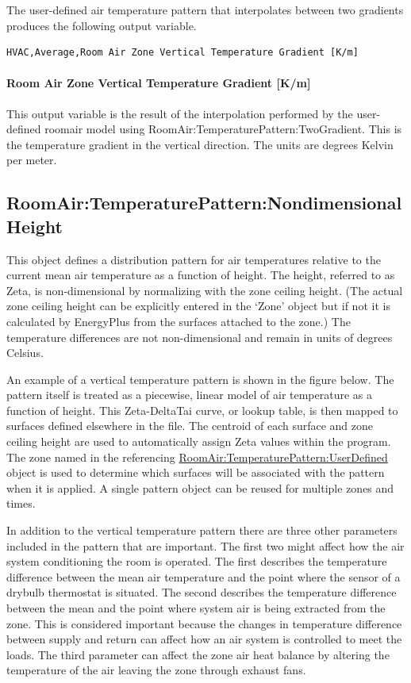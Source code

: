 The user-defined air temperature pattern that interpolates between two gradients produces the following output variable.

\begin{lstlisting}
HVAC,Average,Room Air Zone Vertical Temperature Gradient [K/m]
\end{lstlisting}

\paragraph{Room Air Zone Vertical Temperature Gradient {[}K/m{]}}\label{room-air-zone-vertical-temperature-gradient-km}

This output variable is the result of the interpolation performed by the user-defined roomair model using RoomAir:TemperaturePattern:TwoGradient. This is the temperature gradient in the vertical direction. The units are degrees Kelvin per meter.

\subsection{RoomAir:TemperaturePattern:NondimensionalHeight}\label{roomairtemperaturepatternnondimensionalheight}

This object defines a distribution pattern for air temperatures relative to the current mean air temperature as a function of height. The height, referred to as Zeta, is non-dimensional by normalizing with the zone ceiling height. (The actual zone ceiling height can be explicitly entered in the `Zone' object but if not it is calculated by EnergyPlus from the surfaces attached to the zone.) The temperature differences are not non-dimensional and remain in units of degrees Celsius.

An example of a vertical temperature pattern is shown in the figure below. The pattern itself is treated as a piecewise, linear model of air temperature as a function of height. This Zeta-DeltaTai curve, or lookup table, is then mapped to surfaces defined elsewhere in the file. The centroid of each surface and zone ceiling height are used to automatically assign Zeta values within the program. The zone named in the referencing \hyperref[roomairtemperaturepatternuserdefined]{RoomAir:TemperaturePattern:UserDefined} object is used to determine which surfaces will be associated with the pattern when it is applied. A single pattern object can be reused for multiple zones and times.

In addition to the vertical temperature pattern there are three other parameters included in the pattern that are important. The first two might affect how the air system conditioning the room is operated. The first describes the temperature difference between the mean air temperature and the point where the sensor of a drybulb thermostat is situated. The second describes the temperature difference between the mean and the point where system air is being extracted from the zone. This is considered important because the changes in temperature difference between supply and return can affect how an air system is controlled to meet the loads. The third parameter can affect the zone air heat balance by altering the temperature of the air leaving the zone through exhaust fans.


